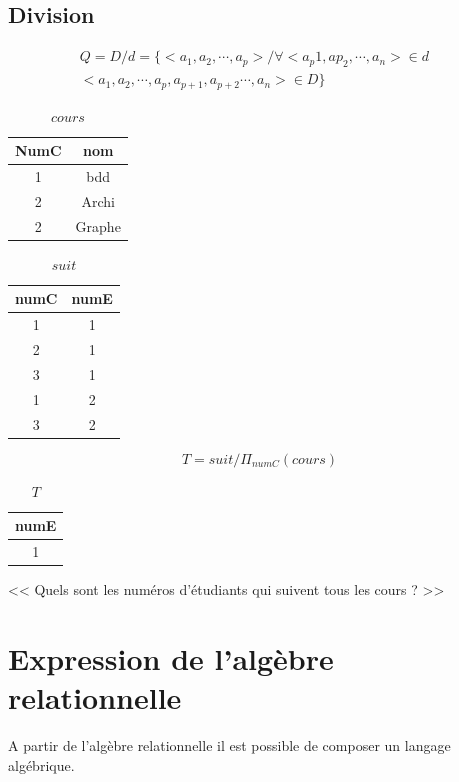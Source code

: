 \documentclass[12pt,a4paper,openany]{book}
\begin{document}
	\subsection{Division}
	\begin{definition}
		\begin{eqnarray*}
		Q = D/d = \{ <a_1,a_2,\cdots,a_p>/\forall <a_p1,ap_2,\cdots,a_n>\in d\\
		<a_1,a_2, \cdots, a_p, a_{p+1}, a_{p+2}\cdots,a_n>\in D\}&
		\end{eqnarray*}
	\end{definition}

	\begin{notation}
		
	\end{notation}

	\begin{exemple}
			\begin{table}[H]
			\centering
			\begin{tabular}{c|c}
				\textbf{NumC} & \textbf{nom}\\
				\hline
				1 & bdd\\
				2 & Archi\\
				2 & Graphe
			\end{tabular}
			\caption{$cours$}
		\end{table}
			\begin{table}[H]
			\centering
			\begin{tabular}{c|c}
				\textbf{numC} & \textbf{numE}\\
				\hline
				1&1\\
				2&1\\
				3&1\\
				1&2\\
				3&2
			\end{tabular}
			\caption{$suit$}
		\end{table}
		$$T = suit/ \Pi_{numC}(cours)$$
		\begin{table}[H]
			\centering
			\begin{tabular}{c}
				\textbf{numE}\\
				\hline
				1
			\end{tabular}
			\caption{$T$}
		\end{table}

		<< Quels sont les numéros d'étudiants qui suivent tous les cours ? >> 
	\end{exemple}

	\section{Expression de l'algèbre relationnelle}
	A partir de l'algèbre relationnelle il est possible de composer un langage algébrique.
\end{document}
